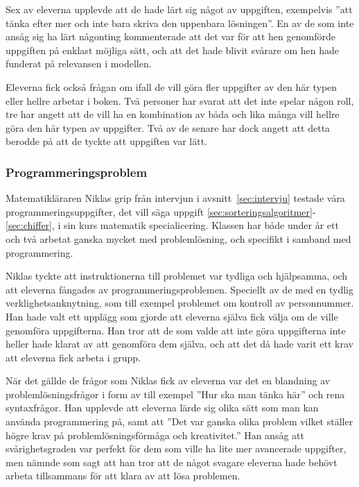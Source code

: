         \textcolor{lila}{Sex av eleverna upplevde att de hade lärt sig något av uppgiften, exempelvis ''att tänka efter mer och inte bara skriva den uppenbara lösningen''. En av de som inte ansåg sig ha lärt någonting kommenterade att det var för att hen genomförde uppgiften på enklast möjliga sätt, och att det hade blivit svårare om hen hade funderat på relevansen i modellen.}
    
        \textcolor{lila}{Eleverna fick också frågan om ifall de vill göra fler uppgifter av den här typen eller hellre arbetar i boken. Två personer har svarat att det inte spelar någon roll, tre har angett att de vill ha en kombination av båda och lika många vill hellre göra den här typen av uppgifter. Två av de senare har dock angett att detta berodde på att de tyckte att uppgiften var lätt.}
        
    \subsubsection{Programmeringsproblem}
        \label{resultat:Programmering}
        
        \textcolor{lila}{Matematikläraren Niklas grip från intervjun i avsnitt~\ref{sec:intervju} testade våra programmeringsuppgifter, det vill säga uppgift \ref{sec:sorteringsalgoritmer}-\ref{sec:chiffer}, i sin kurs matematik specialicering. Klassen har både under år ett och två arbetat ganska mycket med problemlösning, och specifikt i samband med programmering.}
        
        \textcolor{lila}{Niklas tyckte att instruktionerna till problemet var tydliga och hjälpsamma, och att eleverna fångades av programmeringsproblemen. Speciellt av de med en tydlig verklighetsanknytning, som till exempel problemet om kontroll av personnummer. Han hade valt ett upplägg som gjorde att eleverna själva fick välja om de ville genomföra uppgifterna. Han tror att de som valde att inte göra uppgifterna inte heller hade klarat av att genomföra dem själva, och att det då hade varit ett krav att eleverna fick arbeta i grupp.}
        
        \textcolor{lila}{När det gällde de frågor som Niklas fick av eleverna var det en blandning av problemlösningsfrågor i form av till exempel ''Hur ska man tänka här'' och rena syntaxfrågor. Han upplevde att eleverna lärde sig olika sätt som man kan använda programmering på, samt att ''Det var ganska olika problem vilket ställer högre krav på problemlösningsförmåga och kreativitet.'' Han ansåg att svårighetsgraden var perfekt för dem som ville ha lite mer avancerade uppgifter, men nämnde som sagt att han tror att de något svagare eleverna hade behövt arbeta tillsammans för att klara av att lösa problemen.}
        
